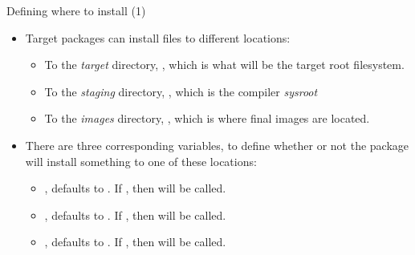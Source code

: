 \begin{frame}{Defining where to install (1)}
  \begin{itemize}
  \item Target packages can install files to different locations:
    \begin{itemize}
    \item To the {\em target} directory, , which is
      what will be the target root filesystem.
    \item To the {\em staging} directory, , which
      is the compiler {\em sysroot}
    \item To the {\em images} directory, , which
      is where final images are located.
    \end{itemize}
  \item There are three corresponding variables, to define whether or
    not the package will install something to one of these locations:
    \begin{itemize}
    \item {}, defaults to . If
      , then  will be
      called.
    \item {}, defaults to . If
      , then  will be
      called.
    \item {}, defaults to . If
      , then  will be
      called.
    \end{itemize}
  \end{itemize}
\end{frame}

